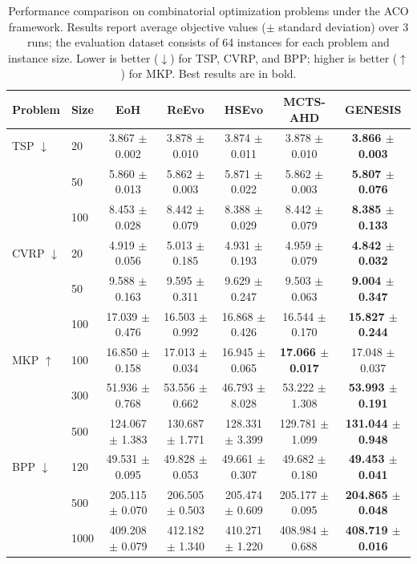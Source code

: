 \documentclass[sigconf,anonymous]{aamas}
\begin{document}
\begin{table}[!tp]
\centering
\small
\caption{
Performance comparison on combinatorial optimization problems under the ACO framework.
Results report average objective values ($\pm$ standard deviation) over 3 runs; the evaluation dataset consists of 64 instances for each problem and instance size.
Lower is better ($\downarrow$) for TSP, CVRP, and BPP; higher is better ($\uparrow$) for MKP. Best results are in bold.
}
\label{tab:main_results}

\begin{tabular*}{\textwidth}{@{\extracolsep{\fill}}llccccc@{}}
\toprule
Problem & Size & EoH & ReEvo & HSEvo & MCTS-AHD & GENESIS \\
\midrule
TSP $\downarrow$ & 20   & 3.867 $\pm$ 0.002 & 3.878 $\pm$ 0.010 & 3.874 $\pm$ 0.011 & 3.878 $\pm$ 0.010 & \textbf{3.866 $\pm$ 0.003} \\
                 & 50   & 5.860 $\pm$ 0.013 & 5.862 $\pm$ 0.003 & 5.871 $\pm$ 0.022 & 5.862 $\pm$ 0.003 & \textbf{5.807 $\pm$ 0.076} \\
                 & 100  & 8.453 $\pm$ 0.028 & 8.442 $\pm$ 0.079 & 8.388 $\pm$ 0.029 & 8.442 $\pm$ 0.079 & \textbf{8.385 $\pm$ 0.133} \\
\midrule
CVRP $\downarrow$ & 20  & 4.919 $\pm$ 0.056 & 5.013 $\pm$ 0.185 & 4.931 $\pm$ 0.193 & 4.959 $\pm$ 0.079 & \textbf{4.842 $\pm$ 0.032} \\
                  & 50  & 9.588 $\pm$ 0.163 & 9.595 $\pm$ 0.311 & 9.629 $\pm$ 0.247 & 9.503 $\pm$ 0.063 & \textbf{9.004 $\pm$ 0.347} \\
                  & 100 & 17.039 $\pm$ 0.476 & 16.503 $\pm$ 0.992 & 16.868 $\pm$ 0.426 & 16.544 $\pm$ 0.170 & \textbf{15.827 $\pm$ 0.244} \\
\midrule
MKP $\uparrow$ & 100    & 16.850 $\pm$ 0.158 & 17.013 $\pm$ 0.034 & 16.945 $\pm$ 0.065 & \textbf{17.066 $\pm$ 0.017} & 17.048 $\pm$ 0.037 \\
               & 300    & 51.936 $\pm$ 0.768 & 53.556 $\pm$ 0.662 & 46.793 $\pm$ 8.028 & 53.222 $\pm$ 1.308 & \textbf{53.993 $\pm$ 0.191} \\
               & 500    & 124.067 $\pm$ 1.383 & 130.687 $\pm$ 1.771 & 128.331 $\pm$ 3.399 & 129.781 $\pm$ 1.099 & \textbf{131.044 $\pm$ 0.948} \\
\midrule
BPP $\downarrow$ & 120  & 49.531 $\pm$ 0.095 & 49.828 $\pm$ 0.053 & 49.661 $\pm$ 0.307 & 49.682 $\pm$ 0.180 & \textbf{49.453 $\pm$ 0.041} \\
                 & 500  & 205.115 $\pm$ 0.070 & 206.505 $\pm$ 0.503 & 205.474 $\pm$ 0.609 & 205.177 $\pm$ 0.095 & \textbf{204.865 $\pm$ 0.048} \\
                 & 1000 & 409.208 $\pm$ 0.079 & 412.182 $\pm$ 1.340 & 410.271 $\pm$ 1.220 & 408.984 $\pm$ 0.688 & \textbf{408.719 $\pm$ 0.016} \\
\bottomrule
\end{tabular*}
\end{table}
\end{document}
